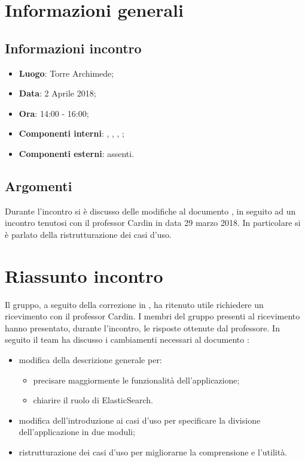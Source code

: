 \section{Informazioni generali}
\subsection{Informazioni incontro}
\begin{itemize}
\item \textbf{Luogo}: Torre Archimede;
\item \textbf{Data}: 2 Aprile 2018;
\item \textbf{Ora}: 14:00 - 16:00;
\item \textbf{Componenti interni}: \Tommaso, \Mattia, \Luca, \Isacco;
\item \textbf{Componenti esterni}: assenti.
\end{itemize}

\subsection{Argomenti}
Durante l'incontro si è discusso delle modifiche al documento \AnalisiRequisiti, in seguito ad un incontro tenutosi con
il professor Cardin in data 29 marzo 2018. In particolare si è parlato della ristrutturazione dei casi d'uso.

\section{Riassunto incontro}

Il gruppo, a seguito della correzione in \RP{}, ha ritenuto utile richiedere un ricevimento con il professor Cardin.
I membri del gruppo presenti al ricevimento hanno presentato, durante l'incontro, le risposte ottenute dal professore.
In seguito il team ha discusso i cambiamenti necessari al documento \vAnalisiDeiRequisiti{}:

    \begin{itemize}
        \item modifica della descrizione generale per:
            \begin{itemize}
                \item precisare maggiormente le funzionalità dell'applicazione;
                \item chiarire il ruolo di ElasticSearch.
            \end{itemize}
        \item modifica dell'introduzione ai casi d'uso per specificare la divisione dell'applicazione in due moduli;
        \item ristrutturazione dei casi d'uso per migliorarne la comprensione e l'utilità.
    \end{itemize}


